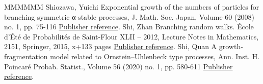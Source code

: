 \documentclass[11pt]{article}
\theoremstyle{definition}
\numberwithin{equation}{section}
\numberwithin{figure}{section}
\numberwithin{table}{section}
\begin{document}
\begin{thebibliography}{MMMMMM}
 Shiozawa, Yuichi Exponential growth of the numbers of particles for branching symmetric α-stable processes, J. Math. Soc. Japan, Volume 60 (2008) no. 1, pp. 75-116 \href{https://ahl.centre-mersenne.org/item/AHL_2020__3__795_0/#Shio}{Publisher reference}.
 Shi, Zhan Branching random walks. École d’Été de Probabilités de Saint-Flour XLII – 2012, Lecture Notes in Mathematics, 2151, Springer, 2015, x+133 pages \href{https://ahl.centre-mersenne.org/item/AHL_2020__3__795_0/#Shi}{Publisher reference}.
 Shi, Quan A growth-fragmentation model related to Ornstein–Uhlenbeck type processes, Ann. Inst. H. Poincaré Probab. Statist., Volume 56 (2020) no. 1, pp. 580-611 \href{https://ahl.centre-mersenne.org/item/AHL_2020__3__795_0/#ShiQ-ou}{Publisher reference}.
\end{thebibliography}
\end{document}
